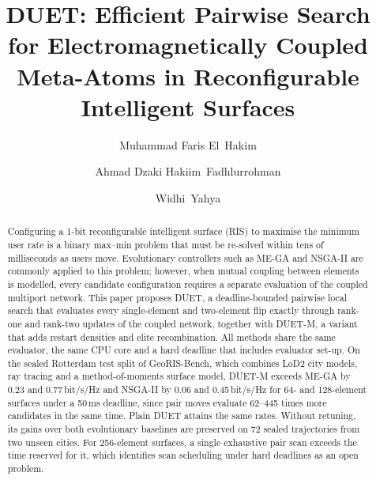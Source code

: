 \documentclass[runningheads]{llncs}
\newcommand{\duet}{\mbox{DUET}}\newcommand{\duetD}{\mbox{DUET-D}}\newcommand{\duetE}{\mbox{DUET-E}}
\newcommand{\bts}{\mbox{DUET-M}}
\begin{document}
\setlength{\emergencystretch}{1.5em}
\title{DUET: Efficient Pairwise Search for Electromagnetically Coupled Meta-Atoms in Reconfigurable Intelligent Surfaces}
\author{Muhammad Faris El~Hakim \and Ahmad Dzaki Hakiim~Fadhlurrohman \and Widhi~Yahya}
\maketitle

\begin{abstract}
Configuring a 1-bit reconfigurable intelligent surface (RIS) to maximise the minimum user rate is a binary max--min problem that must be re-solved within tens of milliseconds as users move. Evolutionary controllers such as ME-GA and NSGA-II are commonly applied to this problem; however, when mutual coupling between elements is modelled, every candidate configuration requires a separate evaluation of the coupled multiport network. This paper proposes DUET, a deadline-bounded pairwise local search that evaluates every single-element and two-element flip exactly through rank-one and rank-two updates of the coupled network, together with \bts{}, a variant that adds restart densities and elite recombination. All methods share the same evaluator, the same CPU core and a hard deadline that includes evaluator set-up. On the sealed Rotterdam test split of GeoRIS-Bench, which combines LoD2 city models, ray tracing and a method-of-moments surface model, \bts{} exceeds ME-GA by 0.23 and 0.77\,bit/s/Hz and NSGA-II by 0.06 and 0.45\,bit/s/Hz for 64- and 128-element surfaces under a 50\,ms deadline, since pair moves evaluate 62--445 times more candidates in the same time. Plain \duet{} attains the same rates. Without retuning, its gains over both evolutionary baselines are preserved on 72 sealed trajectories from two unseen cities. For 256-element surfaces, a single exhaustive pair scan exceeds the time reserved for it, which identifies scan scheduling under hard deadlines as an open problem.
\end{abstract}

\end{document}
